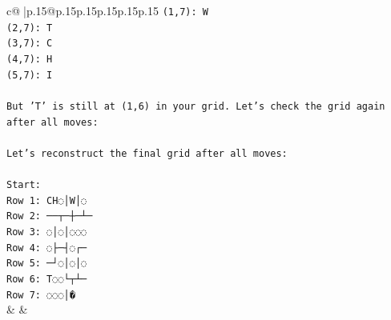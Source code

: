 \documentclass{article}
\begin{document}
{\begin{supertabular}{c@{$\;$}|p{.15\linewidth}@{}p{.15\linewidth}p{.15\linewidth}p{.15\linewidth}p{.15\linewidth}p{.15\linewidth}}
{{{\texttt{(1,7): W} \\
\texttt{(2,7): T} \\
\texttt{(3,7): C} \\
\texttt{(4,7): H} \\
\texttt{(5,7): I} \\
\\ 
\texttt{But 'T' is still at (1,6) in your grid. Let's check the grid again after all moves:} \\
\\ 
\texttt{Let's reconstruct the final grid after all moves:} \\
\\ 
\texttt{Start:} \\
\texttt{Row 1: CH◌│W│◌} \\
\texttt{Row 2: ──┬─┼─┴─} \\
\texttt{Row 3: ◌│◌│◌◌◌} \\
\texttt{Row 4: ◌├─┤◌┌─} \\
\texttt{Row 5: ─┘◌│◌│◌} \\
\texttt{Row 6: T◌◌└┬┴─} \\
\texttt{Row 7: ◌◌◌│�} \\
            }
        }
    }
    & & \\ \\


\end{supertabular}}
\end{document}
